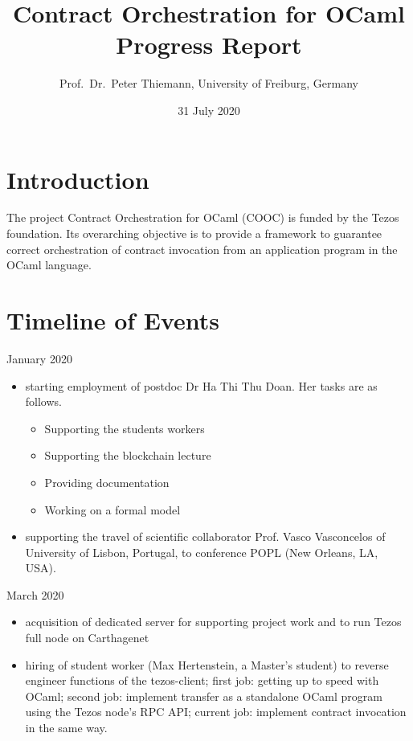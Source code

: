\documentclass[a4paper,11pt]{article}
\title{Contract Orchestration for OCaml \\
  Progress Report 
}
\date{31 July 2020}
\author{Prof.\ Dr.\ Peter Thiemann, University of Freiburg, Germany}
\begin{document}
\maketitle{}

\section{Introduction}
\label{sec:introduction}

The project Contract Orchestration for OCaml (COOC) is funded by the Tezos foundation. Its overarching  objective is to provide a framework to guarantee correct orchestration of contract invocation from an  application program in the OCaml language.

\section{Timeline of Events}
\label{sec:timeline-events}

January 2020
\begin{itemize}
\item starting employment of postdoc Dr Ha Thi Thu Doan. Her tasks are as follows.
\begin{itemize}
\item Supporting the students workers 
\item Supporting the blockchain lecture
\item Providing documentation
\item Working on a formal model
\end{itemize}
\item supporting the travel of scientific collaborator Prof. Vasco Vasconcelos of University of Lisbon, Portugal, to conference POPL (New Orleans, LA, USA).
\end{itemize}


March 2020
\begin{itemize}
\item acquisition of dedicated server for supporting project work and
  to run Tezos full node on Carthagenet
\item hiring of student worker (Max Hertenstein, a Master's student) to reverse engineer functions of the tezos-client; first job: getting up to speed with OCaml; second job: implement transfer as a standalone OCaml program using the Tezos node's RPC API; current job: implement contract invocation in the same way. 
\end{itemize}
\end{document}
